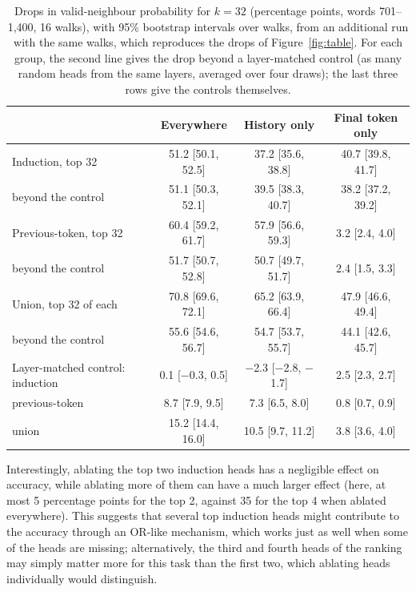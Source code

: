 \documentclass[11pt,a4paper]{article}
\begin{document}
\begin{table}[tbp]
  \centering
  \small
  \caption{Drops in valid-neighbour probability for $k = 32$ (percentage points, words 701--1,400, 16 walks), with
  95\% bootstrap intervals over walks, from an additional run with the same walks, which reproduces the drops of
  Figure~\ref{fig:table}. For each group, the second line gives the drop beyond a layer-matched control (as many random
  heads from the same layers, averaged over four draws); the last three rows give the controls themselves.}
  \label{tab:k32}
  \begin{tabular}{lccc}
    \toprule
    & Everywhere & History only & Final token only \\
    \midrule
    Induction, top 32 & 51.2 [50.1, 52.5] & 37.2 [35.6, 38.8] & 40.7 [39.8, 41.7] \\
    \quad beyond the control & 51.1 [50.3, 52.1] & 39.5 [38.3, 40.7] & 38.2 [37.2, 39.2] \\
    Previous-token, top 32 & 60.4 [59.2, 61.7] & 57.9 [56.6, 59.3] & 3.2 [2.4, 4.0] \\
    \quad beyond the control & 51.7 [50.7, 52.8] & 50.7 [49.7, 51.7] & 2.4 [1.5, 3.3] \\
    Union, top 32 of each & 70.8 [69.6, 72.1] & 65.2 [63.9, 66.4] & 47.9 [46.6, 49.4] \\
    \quad beyond the control & 55.6 [54.6, 56.7] & 54.7 [53.7, 55.7] & 44.1 [42.6, 45.7] \\
    \midrule
    Layer-matched control: induction & 0.1 [$-$0.3, 0.5] & $-$2.3 [$-$2.8, $-$1.7] & 2.5 [2.3, 2.7] \\
    \quad previous-token & 8.7 [7.9, 9.5] & 7.3 [6.5, 8.0] & 0.8 [0.7, 0.9] \\
    \quad union & 15.2 [14.4, 16.0] & 10.5 [9.7, 11.2] & 3.8 [3.6, 4.0] \\
    \bottomrule
  \end{tabular}
\end{table}

Interestingly, ablating the top two induction heads has a negligible effect on accuracy, while ablating more of them
can have a much larger effect (here, at most 5 percentage points for the top 2, against 35 for the top 4 when ablated
everywhere). This suggests that several top induction heads might contribute to the accuracy through
an OR-like mechanism, which works just as well when some of the heads are missing; alternatively, the third and fourth
heads of the ranking may simply matter more for this task than the first two, which ablating heads individually would
distinguish.
\end{document}
